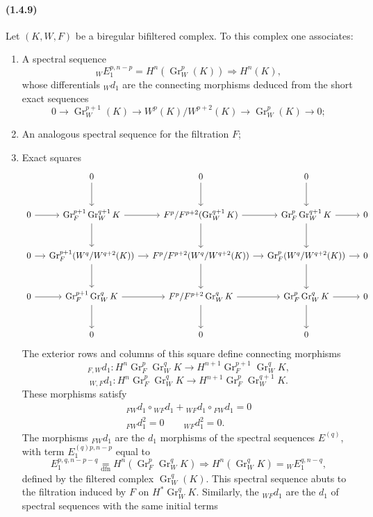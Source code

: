\documentclass[10pt]{article}
\newcommand{\Gr}{\operatorname{Gr}}
\begin{document}
\paragraph{(1.4.9)} Let $(K,W,F)$ be a biregular bifiltered complex. To this complex one associates:
\begin{enumerate}[label=\alph*)]
\item A spectral sequence
\[
{}_WE_1^{p,n-p}=H^n(\Gr_W^p(K))\Rightarrow H^n(K),
\]
whose differentials ${}_Wd_1$ are the connecting morphisms deduced from the short exact sequences
\[
0\to\Gr_W^{p+1}(K)\to W^p(K)/W^{p+2}(K)\to\Gr_W^p(K)\to0;
\]
\item An analogous spectral sequence for the filtration $F$;
\item Exact squares
\[
\begin{tikzcd}[column sep=small,row sep=large]
& 0 \arrow[d] & 0 \arrow[d] & 0 \arrow[d] & \\
0 \arrow[r] & \Gr_F^{p+1}\Gr_W^{q+1}K \arrow[r] \arrow[d] & F^p/F^{p+2}(\Gr_W^{q+1}K) \arrow[r] \arrow[d] & \Gr_F^{p}\Gr_W^{q+1}K \arrow[r] \arrow[d] & 0\\
0 \arrow[r] & \Gr_F^{p+1}(W^q/W^{q+2}(K)) \arrow[r] \arrow[d] & F^p/F^{p+2}(W^q/W^{q+2}(K)) \arrow[r] \arrow[d] & \Gr_F^{p}(W^q/W^{q+2}(K)) \arrow[r] \arrow[d] & 0\\
0 \arrow[r] & \Gr_F^{p+1}\Gr_W^{q}K \arrow[r] \arrow[d] & F^p/F^{p+2}\Gr_W^{q}K \arrow[r] \arrow[d] & \Gr_F^{p}\Gr_W^{q}K \arrow[r] \arrow[d] & 0\\
& 0 & 0 & 0
\end{tikzcd}
\]
The exterior rows and columns of this square define connecting morphisms
\[
{}_{F,W}d_1:H^n\Gr_F^p\Gr_W^qK\longrightarrow H^{n+1}\Gr_F^{p+1}\Gr_W^qK,
\]
\[
{}_{W,F}d_1:H^n\Gr_F^p\Gr_W^qK\longrightarrow H^{n+1}\Gr_F^p\Gr_W^{q+1}K.
\]
These morphisms satisfy
\[
\begin{gathered}
{}_{FW}d_1\circ{}_{WF}d_1+{}_{WF}d_1\circ{}_{FW}d_1=0\\
{}_{FW}d_1^2=0\qquad {}_{WF}d_1^2=0.
\end{gathered}
\]
The morphisms ${}_{FW}d_1$ are the $d_1$ morphisms of the spectral sequences $E^{(q)}$, with term $E_1^{(q)p,n-p}$ equal to
\[
\tag{1.4.9.1}
E_1^{p,q,n-p-q}\underset{\mathrm{dfn}}{=}H^n(\Gr_F^p\Gr_W^qK)\Rightarrow H^n(\Gr_W^qK)={}_WE_1^{q,n-q},
\]
defined by the filtered complex $\Gr_W^q(K)$. This spectral sequence abuts to the filtration induced by $F$ on $H^*\Gr_W^qK$. Similarly, the ${}_{WF}d_1$ are the $d_1$ of spectral sequences with the same initial terms
\[
\tag{1.4.9.2}
\]
\end{enumerate}
\end{document}
